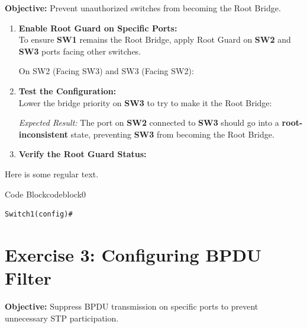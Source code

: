 \documentclass[a4paper]{book}
\begin{document}
\textbf{Objective:} Prevent unauthorized switches from becoming the Root Bridge.

\begin{enumerate} 
    \item \textbf{Enable Root Guard on Specific Ports:} \\
    To ensure \textbf{SW1} remains the Root Bridge, apply Root Guard on \textbf{SW2} and \textbf{SW3} ports facing other switches.

    On SW2 (Facing SW3) and SW3 (Facing SW2):


    \item \textbf{Test the Configuration:} \\
    Lower the bridge priority on \textbf{SW3} to try to make it the Root Bridge:


    \textit{Expected Result:} The port on \textbf{SW2} connected to \textbf{SW3} should go into a \textbf{root-inconsistent} state, preventing \textbf{SW3} from becoming the Root Bridge.

    \item \textbf{Verify the Root Guard Status:}

\end{enumerate}



Here is some regular text. \\
\vspace{0.5cm}




\begin{ocg}{Code Block}{codeblock}{0}
\vspace{0.5cm}
\begin{lstlisting}
Switch1(config)# 
\end{lstlisting}
\end{ocg}


\section*{Exercise 3: Configuring BPDU Filter}

\textbf{Objective:} Suppress BPDU transmission on specific ports to prevent unnecessary STP participation.
\end{document}
